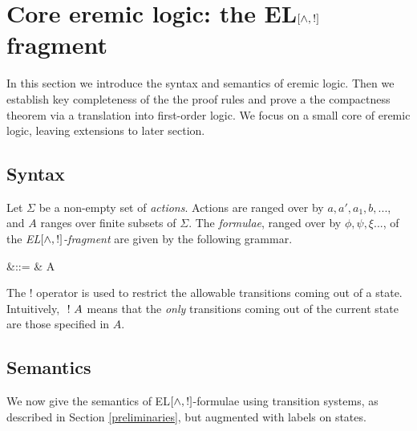 \section{Core eremic logic: the EL$[\land, !]$ fragment}\label{coreEL}

In this section we introduce the syntax and semantics of eremic logic.
Then we establish key completeness of the the proof rules and prove a
the compactness theorem via a translation into first-order logic. We
focus on a small core of eremic logic, leaving extensions to later
section.

\subsection{Syntax}



\begin{definition} Let $\Sigma$ be a non-empty set of \emph{actions}.
Actions are ranged over by $a, a', a_1, b, ...$, and $A$ ranges over
finite subsets of $\Sigma$. The \emph{formulae}, ranged over by $\phi,
\psi, \xi ...$, of the \emph{EL$[\land, !]$-fragment} are given by the
following grammar.

\begin{GRAMMAR}
  \phi 
     &\quad ::= \quad & 
  \TRUE 
     \VERTICAL 
  \phi \AND \psi
     \VERTICAL 
     \VERTICAL 
  \fBang A 
\end{GRAMMAR}

\NI The $!$ operator is used to restrict the allowable transitions
coming out of a state.  Intuitively, $\ ! \  A$ means that the
\emph{only} transitions coming out of the current state are those
specified in $A$.



\end{definition}

\subsection{Semantics}

\NI We now give the semantics of EL$[\land, !]$-formulae using
transition systems, as described in Section \ref{preliminaries}, but
augmented with labels on states.

